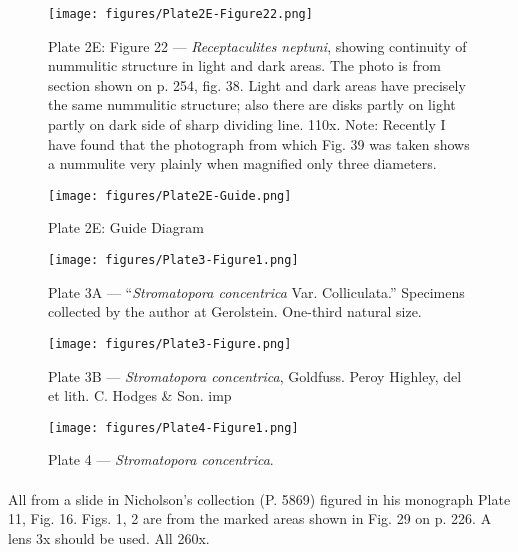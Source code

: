 \documentclass[a4paper, 12pt, oneside]{article}
\begin{document}
\clearpage
\begin{figure}[b]
\centering
\texttt{[image: figures/Plate2E-Figure22.png]}
\caption{\small Plate 2E: Figure 22 --- \emph{Receptaculites neptuni}, showing continuity of nummulitic structure in light and dark areas. The photo is from section shown on p. 254, fig. 38. Light and dark areas have precisely the same nummulitic structure; also there are disks partly on light partly on dark side of sharp dividing line. 110x. Note: Recently I have found that the photograph from which Fig. 39 was taken shows a nummulite very plainly when magnified only three diameters.}
\end{figure}
\clearpage
\begin{figure}[b]
\centering
\texttt{[image: figures/Plate2E-Guide.png]}
\caption{\small Plate 2E: Guide Diagram}
\end{figure}
\clearpage
{}
\cfoot{\thepage}
\begin{figure}[b]
\centering
\texttt{[image: figures/Plate3-Figure1.png]}
\caption{\small Plate 3A --- ``\emph{Stromatopora concentrica} Var. Colliculata.'' Specimens collected by the author at Gerolstein. One-third natural size.}
\end{figure}
\clearpage
{}
\cfoot{\thepage}
\begin{figure}[b]
\centering
\texttt{[image: figures/Plate3-Figure.png]}
\caption{\small Plate 3B --- \emph{Stromatopora concentrica}, Goldfuss. Peroy Highley, del et lith. C. Hodges \& Son. imp}
\end{figure}
\clearpage
{}
\cfoot{\thepage}
\begin{figure}[H]
\centering
\texttt{[image: figures/Plate4-Figure1.png]}
\caption{\small Plate 4 --- \emph{Stromatopora concentrica}.}
\end{figure}
\paragraph{}
All from a slide in Nicholson's collection (P. 5869) figured in his monograph Plate 11, Fig. 16. Figs. 1, 2 are from the marked areas shown in Fig. 29 on p. 226. A lens 3x should be used. All 260x.
\end{document}

